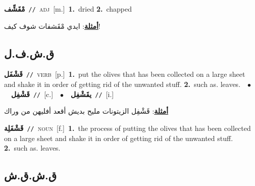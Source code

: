 \documentclass[10pt,a4paper,twoside]{article} %
\begin{document}
\begin{multicols}{2}
{\setlength\topsep{0pt}\textbf{\foreignlanguage{arabic}{مْقَشِّف}}\ {\color{gray}\texttt{//}\color{black}}\ \textsc{adj}\ [m.]\ \textbf{1.}~dried  \textbf{2.}~chapped\  \begin{flushright}\color{gray}\foreignlanguage{arabic}{\textbf{\underline{\foreignlanguage{arabic}{أمثلة}}}: ايدي مْقَشفات شوف كيف!}\end{flushright}\color{black}} \vspace{2mm}

\vspace{-3mm}
\subsection*{\color{blue}\foreignlanguage{arabic}{ق.ش.ف.ل}\color{blue}{}} 

{\setlength\topsep{0pt}\textbf{\foreignlanguage{arabic}{قَشْفَل}}\ {\color{gray}\texttt{//}\color{black}}\ \textsc{verb}\ [p.]\ \textbf{1.}~put the olives that has been collected on a large sheet and shake it in order of getting rid of the unwanted stuff.  \textbf{2.}~such as. leaves.\ \ $\bullet$\ \ \setlength\topsep{0pt}\textbf{\foreignlanguage{arabic}{قَشْفِل}}\ {\color{gray}\texttt{//}\color{black}}\ [c.]\ \ $\bullet$\ \ \setlength\topsep{0pt}\textbf{\foreignlanguage{arabic}{يقَشْفِل}}\ {\color{gray}\texttt{//}\color{black}}\ [i.]\  \begin{flushright}\color{gray}\foreignlanguage{arabic}{\textbf{\underline{\foreignlanguage{arabic}{أمثلة}}}: قَشْفِل الزيتونات مليح بديش أقعد أفليهن من وراك}\end{flushright}\color{black}} \vspace{2mm}

{\setlength\topsep{0pt}\textbf{\foreignlanguage{arabic}{قَشْفَلِة}}\ {\color{gray}\texttt{//}\color{black}}\ \textsc{noun}\ [f.]\ \textbf{1.}~the process of putting the olives that has been collected on a large sheet and shake it in order of getting rid of the unwanted stuff.  \textbf{2.}~such as. leaves.\ } \vspace{2mm}

\vspace{-3mm}
\subsection*{\color{blue}\foreignlanguage{arabic}{ق.ش.ق.ش}\color{blue}{}} 


\end{multicols}
\end{document}
